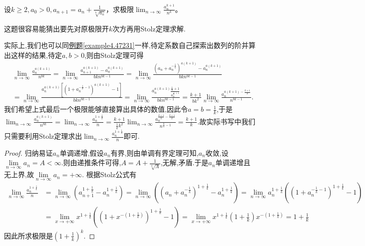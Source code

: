 \documentclass[../../main.tex]{subfiles}%
\begin{document}
\begin{example}
设\(k\geqslant 2,a_0 > 0,a_{n + 1}=a_n+\frac{1}{\sqrt[k]{a_n}}\)，求极限\(\lim_{n\rightarrow\infty}\frac{a_n^{k + 1}}{n^k}\)。
\end{example}
\begin{note}
这题很容易能猜出要先对原极限开$k$次方再用Stolz定理求解.

实际上,我们也可以同\hyperref[example4.47231]{例题\ref{example4.47231}}一样,待定系数自己探索出数列的阶并算出这样的结果,待定$a,b>0$,则由Stolz定理可得
\begin{align*}
&\lim_{n\rightarrow \infty} \frac{a_{n}^{a\left( k+1 \right)}}{n^{bk}}=\lim_{n\rightarrow \infty} \frac{a_{n+1}^{a\left( k+1 \right)}-a_{n}^{a\left( k+1 \right)}}{bkn^{bk-1}}=\lim_{n\rightarrow \infty} \frac{\left( a_n+a_{n}^{-\frac{1}{k}} \right) ^{a\left( k+1 \right)}-a_{n}^{a\left( k+1 \right)}}{bkn^{bk-1}}
\\
&=\lim_{n\rightarrow \infty} \frac{a_{n}^{a\left( k+1 \right)}\left[ \left( 1+a_{n}^{-\frac{1}{k}-1} \right) ^{a\left( k+1 \right)}-1 \right]}{bkn^{bk-1}}=\lim_{n\rightarrow \infty} \frac{a_{n}^{a\left( k+1 \right)}\frac{\frac{1}{k}+1}{a_{n}^{\frac{1}{k}+1}}}{bkn^{bk-1}}=\frac{k+1}{bk^2}\lim_{n\rightarrow \infty} \frac{a_{n}^{a\left( k+1 \right) -\frac{k+1}{k}}}{n^{bk-1}}.
\end{align*}
我们希望上式最后一个极限能够直接算出具体的数值,因此令$a=b=\frac{1}{k}$,于是$\lim_{n\rightarrow \infty} \frac{a_{n}^{a\left( k+1 \right)}}{n^{bk}}=\lim_{n\rightarrow \infty} \frac{a_{n}^{1+\frac{1}{k}}}{n}=\frac{k+1}{\frac{1}{k}k^2}\lim_{n\rightarrow \infty} \frac{a_{n}^{\frac{k+1}{k}-\frac{k+1}{k}}}{n^{\frac{k}{k}-1}}=\frac{k+1}{k}$.故实际书写中我们只需要利用Stolz定理求出\(\lim_{n\rightarrow\infty}\frac{a_n^{1+\frac{1}{k}}}{n}\)即可.
\end{note}
\begin{proof}

归纳易证\(a_n\)单调递增,假设$a_n$有界,则由单调有界定理可知,$a_n$收敛,设$\underset{n\rightarrow \infty}{\lim}a_n=A<\infty $.则由递推条件可得,$A=A+\frac{1}{\sqrt[k]{A}}$,无解,矛盾.于是$a_n$单调递增且无上界,故$\underset{n\rightarrow \infty}{\lim}a_n=+\infty$.
根据Stolz公式有
\begin{align*}
\lim_{n\rightarrow\infty}\frac{a_n^{1+\frac{1}{k}}}{n}&=\lim_{n\rightarrow\infty}\left(a_{n + 1}^{1+\frac{1}{k}}-a_n^{1+\frac{1}{k}}\right)=\lim_{n\rightarrow\infty}\left(\left(a_n + a_n^{-\frac{1}{k}}\right)^{1+\frac{1}{k}}-a_n^{1+\frac{1}{k}}\right)=\lim_{n\rightarrow\infty}a_n^{1+\frac{1}{k}}\left(\left(1 + a_n^{-\frac{1}{k}-1}\right)^{1+\frac{1}{k}}-1\right)\\
&=\lim_{x\rightarrow+\infty}x^{1+\frac{1}{k}}\left(\left(1 + x^{-(1+\frac{1}{k})}\right)^{1+\frac{1}{k}}-1\right)=\lim_{x\rightarrow+\infty}x^{1+\frac{1}{k}}\left(1+\frac{1}{k}\right)x^{-(1+\frac{1}{k})}=1+\frac{1}{k}
\end{align*}
因此所求极限是\(\left(1+\frac{1}{k}\right)^k\).

\end{proof}
\end{document}
